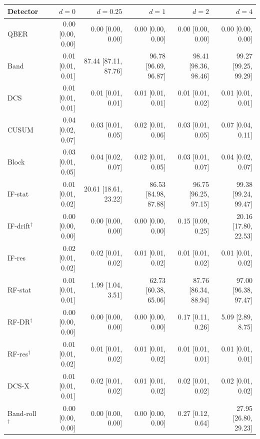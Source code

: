 \begin{tabular}{lrrrrr}
\hline
Detector & $d=0$ & $d=0.25$ & $d=1$ & $d=2$ & $d=4$\\
\hline
QBER & 0.00 [0.00, 0.00] & 0.00 [0.00, 0.00] & 0.00 [0.00, 0.00] & 0.00 [0.00, 0.00] & 0.00 [0.00, 0.00]\\
Band & 0.01 [0.01, 0.01] & 87.44 [87.11, 87.76] & 96.78 [96.69, 96.87] & 98.41 [98.36, 98.46] & 99.27 [99.25, 99.29]\\
DCS & 0.01 [0.01, 0.01] & 0.01 [0.01, 0.01] & 0.01 [0.01, 0.01] & 0.01 [0.01, 0.02] & 0.01 [0.01, 0.01]\\
CUSUM & 0.04 [0.02, 0.07] & 0.03 [0.01, 0.05] & 0.02 [0.01, 0.06] & 0.03 [0.01, 0.05] & 0.07 [0.04, 0.11]\\
Block & 0.03 [0.01, 0.05] & 0.04 [0.02, 0.07] & 0.02 [0.01, 0.05] & 0.03 [0.01, 0.07] & 0.04 [0.02, 0.07]\\
IF-stat & 0.01 [0.01, 0.02] & 20.61 [18.61, 23.22] & 86.53 [84.98, 87.88] & 96.75 [96.25, 97.15] & 99.38 [99.24, 99.47]\\
IF-drift$^\dagger$ & 0.00 [0.00, 0.00] & 0.00 [0.00, 0.00] & 0.00 [0.00, 0.00] & 0.15 [0.09, 0.25] & 20.16 [17.80, 22.53]\\
IF-res & 0.02 [0.01, 0.02] & 0.02 [0.01, 0.02] & 0.01 [0.01, 0.02] & 0.01 [0.01, 0.02] & 0.01 [0.01, 0.02]\\
RF-stat & 0.01 [0.01, 0.01] & 1.99 [1.04, 3.51] & 62.73 [60.38, 65.06] & 87.76 [86.34, 88.94] & 97.00 [96.38, 97.47]\\
RF-DR$^\dagger$ & 0.00 [0.00, 0.00] & 0.00 [0.00, 0.00] & 0.00 [0.00, 0.00] & 0.17 [0.11, 0.26] & 5.09 [2.89, 8.75]\\
RF-res$^\dagger$ & 0.01 [0.01, 0.02] & 0.01 [0.01, 0.02] & 0.01 [0.01, 0.02] & 0.01 [0.01, 0.01] & 0.01 [0.01, 0.01]\\
DCS-X & 0.01 [0.01, 0.01] & 0.02 [0.01, 0.02] & 0.01 [0.01, 0.02] & 0.02 [0.01, 0.02] & 0.02 [0.01, 0.02]\\
Band-roll$^\dagger$ & 0.00 [0.00, 0.00] & 0.00 [0.00, 0.00] & 0.00 [0.00, 0.00] & 0.27 [0.12, 0.64] & 27.95 [26.80, 29.23]\\
\hline
\end{tabular}